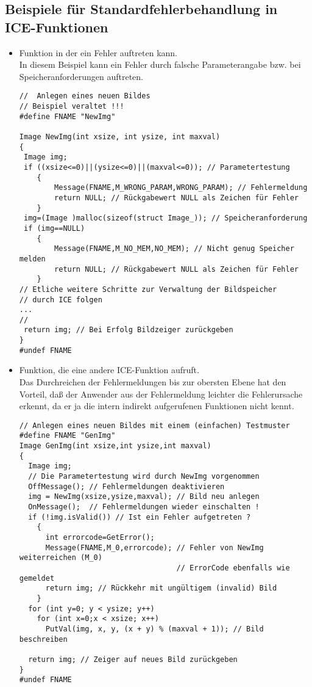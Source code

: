 \subsection{Beispiele für Standardfehlerbehandlung in ICE-Funktionen}
\begin{itemize}
\item Funktion in der ein Fehler auftreten kann.\\
In diesem Beispiel kann ein Fehler durch falsche Parameterangabe bzw. 
bei Speicheranforderungen auftreten.
\begprogr
\begin{verbatim}
//  Anlegen eines neuen Bildes 
// Beispiel veraltet !!!
#define FNAME "NewImg"

Image NewImg(int xsize, int ysize, int maxval)
{
 Image img;
 if ((xsize<=0)||(ysize<=0)||(maxval<=0)); // Parametertestung
    {
        Message(FNAME,M_WRONG_PARAM,WRONG_PARAM); // Fehlermeldung
        return NULL; // Rückgabewert NULL als Zeichen für Fehler
    }
 img=(Image )malloc(sizeof(struct Image_)); // Speicheranforderung
 if (img==NULL)
    {
        Message(FNAME,M_NO_MEM,NO_MEM); // Nicht genug Speicher melden
        return NULL; // Rückgabewert NULL als Zeichen für Fehler
    }
// Etliche weitere Schritte zur Verwaltung der Bildspeicher 
// durch ICE folgen
...
//
 return img; // Bei Erfolg Bildzeiger zurückgeben
}
#undef FNAME
\end{verbatim}
\endprogr
\item Funktion, die eine andere ICE-Funktion aufruft.\\
Das Durchreichen der Fehlermeldungen bis zur obersten Ebene hat den 
Vorteil, daß der Anwender aus der Fehlermeldung leichter die Fehlerursache 
erkennt, da er ja die intern indirekt aufgerufenen Funktionen nicht kennt.
\begprogr
\begin{verbatim}
// Anlegen eines neuen Bildes mit einem (einfachen) Testmuster
#define FNAME "GenImg"
Image GenImg(int xsize,int ysize,int maxval)
{
  Image img;
  // Die Parametertestung wird durch NewImg vorgenommen
  OffMessage(); // Fehlermeldungen deaktivieren
  img = NewImg(xsize,ysize,maxval); // Bild neu anlegen
  OnMessage();  // Fehlermeldungen wieder einschalten !
  if (!img.isValid()) // Ist ein Fehler aufgetreten ?
    {
      int errorcode=GetError();
      Message(FNAME,M_0,errorcode); // Fehler von NewImg weiterreichen (M_0)
                                    // ErrorCode ebenfalls wie gemeldet 
      return img; // Rückkehr mit ungültigem (invalid) Bild
    }
  for (int y=0; y < ysize; y++)
    for (int x=0;x < xsize; x++)
      PutVal(img, x, y, (x + y) % (maxval + 1)); // Bild beschreiben

  return img; // Zeiger auf neues Bild zurückgeben
}
#undef FNAME
\end{verbatim}\endprogr
\end{itemize}
